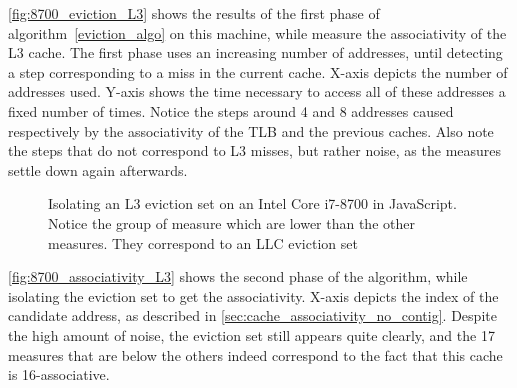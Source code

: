 \documentclass[a4paper,11pt,oneside]{report}
\begin{document}
\autoref{fig:8700_eviction_L3} shows the results of the first phase of algorithm~\autoref{eviction_algo} on this machine, while measure the associativity of the L3 cache. The first phase uses an increasing number of addresses, until detecting a step corresponding to a miss in the current cache. X-axis depicts the number of addresses used. Y-axis shows the time necessary to access all of these addresses a fixed number of times. Notice the steps around 4 and 8 addresses caused respectively by the associativity of the TLB and the previous caches. Also note the steps that do not correspond to L3 misses, but rather noise, as the measures settle down again afterwards.

\begin{figure}
    \centering
    \caption{Isolating an L3 eviction set on an Intel Core i7-8700 in JavaScript. Notice the group of measure which are lower than the other measures. They correspond to an LLC eviction set}
    \label{fig:8700_associativity_L3}
\end{figure}

\autoref{fig:8700_associativity_L3} shows the second phase of the algorithm, while isolating the eviction set to get the associativity. X-axis depicts the index of the candidate address, as described in \autoref{sec:cache_associativity_no_contig}. Despite the high amount of noise, the eviction set still appears quite clearly, and the 17 measures that are below the others indeed correspond to the fact that this cache is 16-associative.
\end{document}

